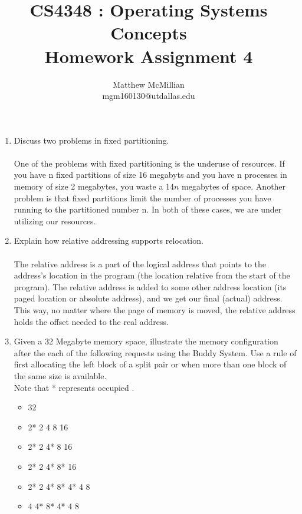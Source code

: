\documentclass[12pt]{article}
\begin{document}
\title{CS4348 : Operating Systems Concepts\\Homework Assignment 4}
\author{Matthew McMillian\\mgm160130@utdallas.edu}
\maketitle

\begin{enumerate}

	\item Discuss two problems in fixed partitioning.\\ \\
	One of the problems with fixed partitioning is the underuse of resources. If you have n fixed partitions of size 16 megabyts and you have n processes in memory of size 2 megabytes, you waste a 14$n$ megabytes of space. Another problem is that fixed partitions limit the number of processes you have running to the partitioned number n. In both of these cases, we are under utilizing our resources. \\
	
	\item Explain how relative addressing supports relocation. \\ \\
	The relative address is a part of the logical address that points to the address's location in the program (the location relative from the start of the program). The relative address is added to some other address location (its paged location or absolute address), and we get our final (actual) address. This way, no matter where the page of memory is moved, the relative address holds the offset needed to the real address.\\
	
	\item  Given a 32 Megabyte memory space, illustrate the memory configuration after the each of the following requests using the Buddy System.  Use a rule of first allocating the left block of a split pair or when
more than one block of the same size is available.\\	
	Note that * represents occupied .
	\begin{itemize}	
		\item 32
		\item 2* 2 4 8 16
		\item 2* 2 4* 8 16
		\item 2* 2 4* 8* 16
		\item 2* 2 4* 8* 4* 4 8
		\item 4 4* 8* 4* 4 8
	\end{itemize}


\end{enumerate}
\end{document}
